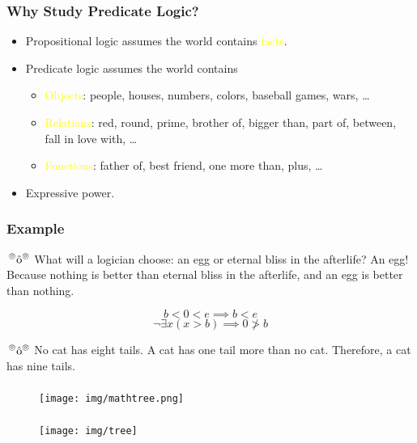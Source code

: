 \documentclass[UTF8,11pt,colorlinks,compress,openany]{beamer}%
\begin{document}
\begin{frame}\frametitle{Why Study Predicate Logic?}
	\begin{itemize}
		\item Propositional logic assumes the world contains \textcolor{yellow}{facts}.
		\item Predicate logic assumes the world contains
		\begin{itemize}
			\item \textcolor{yellow}{Objects}: people, houses, numbers, colors, baseball games, wars, \dots
			\item \textcolor{yellow}{Relations}: red, round, prime, brother of, bigger than, part of, between, fall in love with, \dots
			\item \textcolor{yellow}{Functions}: father of, best friend, one more than, plus, \dots
		\end{itemize}
		\item Expressive power.
	\end{itemize}
\end{frame}

\begin{frame}\frametitle{Example}
	\begin{block}{$\sideset{^\circledcirc}{^\circledcirc}{\operatorname{\hat{o}}}$}
		What will a logician choose: an egg or eternal bliss in the afterlife? An egg! Because nothing is better than eternal bliss in the afterlife, and an egg is better than nothing.
	\end{block}
	\[b<0<e\implies b<e\]
	\[\neg\exists x(x>b)\implies 0\ngtr b\]
	\begin{block}{$\sideset{^\circledcirc}{^\circledcirc}{\operatorname{\hat{o}}}$}
		No cat has eight tails. A cat has one tail more than no cat. Therefore, a cat has nine tails.
	\end{block}
\end{frame}

\begin{frame}\frametitle{}
	\begin{figure}
		\texttt{[image: img/mathtree.png]}
	\end{figure}
\end{frame}

\begin{frame}\frametitle{}
	\begin{figure}
		\colorbox{green!15}{\texttt{[image: img/tree]}}
	\end{figure}
\end{frame}
\end{document}
